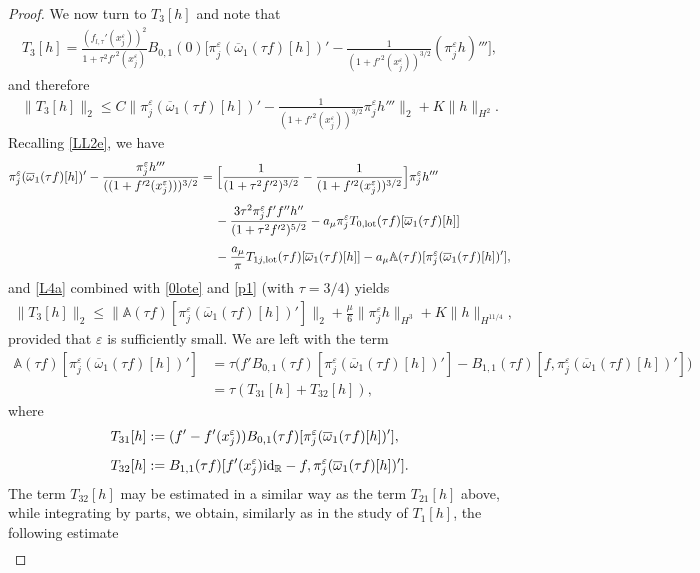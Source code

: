 \documentclass[11pt,reqno]{amsart}
\numberwithin{equation}{section}
\newcommand{\0}{\Omega}
\newcommand{\e}{\varepsilon}
\newcommand{\ov}{\overline}
\newcommand{\oo}{\ov\omega}
\newcommand{\bA}{\mathbb{A}}
\newcommand{\R}{\mathbb{R}}
\numberwithin{equation}{section}
\begin{document}
\begin{proof}
We now turn to  $T_3[h]$ and  note that 
\begin{align*}
 T_3[h] = \frac{(f_{l,\tau}'(x_j^\e))^2}{1+\tau^2 f'^2(x_j^\e)} B_{0,1}(0)  \Big[\pi^\e_j(\oo_1(\tau f)[h])' -\frac{1}{(1+f'^2(x_j^\e))^{3/2}}(\pi^\e_j h)'''\Big],   
\end{align*}
and therefore
\begin{align}\label{L4a}
 \|T_3[h]\|_2\leq C\Big\|\pi^\e_j(\oo_1(\tau f)[h])' -\frac{1}{(1+f'^2(x_j^\e))^{3/2}}\pi^\e_j h'''\Big\|_2+K\|h\|_{H^2}.
\end{align}
Recalling \eqref{LL2e}, we have
\begin{align*}
\pi_j^\e(\oo_1(\tau f)[h])'-\frac{\pi^\e_j h'''}{((1+f'^2(x_j^\e)))^{3/2}}&= \Big[\frac{1}{(1+\tau^2f'^2)^{3/2}}-\frac{1}{(1+f'^2(x_j^\e))^{3/2}}\Big]\pi^\e_j h'''\\[1ex]
&\hspace{0.424cm}-\frac{3\tau^2\pi_j^\e f'f'' h''}{(1+\tau^2f'^2)^{5/2}}-a_\mu \pi_j^\e T_{0,{\rm lot}}(\tau f)[\oo_1(\tau f)[h]]\\[1ex]
 &\hspace{0.424cm}-\frac{ a_\mu }{\pi}T_{1j,{\rm lot}}(\tau f)[\oo_1(\tau f)[h]]-a_\mu \bA(\tau f)[\pi_j^\e(\oo_1(\tau f)[h])'],
\end{align*}
and \eqref{L4a} combined with \eqref{0lote} and \eqref{p1} (with $\tau=3/4$)  yields 
\begin{align}\label{L4b}
 \|T_3[h]\|_2\leq \|\bA(\tau f)[\pi_j^\e(\oo_1(\tau f)[h])']\|_2+\frac{\mu}{6}\|\pi^\e_j h \|_{H^3}+ K\|h\|_{H^{11/4}},
\end{align}
provided that $\e$ is sufficiently small.
We are left with the term
\begin{align*} 
 \bA(\tau f)[\pi_j^\e(\oo_1(\tau f)[h])']&=\tau\big(f'B_{0,1}(\tau f)[\pi_j^\e(\oo_1(\tau f)[h])'] -B_{1,1}(\tau f)[f,\pi_j^\e(\oo_1(\tau f)[h])']\big)\nonumber\\[1ex]
 &=\tau(T_{31}[h]+T_{32}[h]),
\end{align*}
where
\begin{align*}
 T_{31}[h]&:=(f'-f'(x_j^\e))B_{0,1}(\tau f)[\pi_j^\e(\oo_1(\tau f)[h])'],\\[1ex]
 T_{32}[h]&:=B_{1,1}(\tau f)[f'(x_j^\e){\rm id}_\R-f,\pi_j^\e(\oo_1(\tau f)[h])'].
\end{align*}
The term $T_{32}[h]$ may be estimated in a  similar way as the term $T_{21}[h]$ above, while integrating by parts, we obtain, similarly as in the study of $T_1[h]$, the following estimate 
\begin{align*}

\end{align*}
\end{proof}
\end{document}
